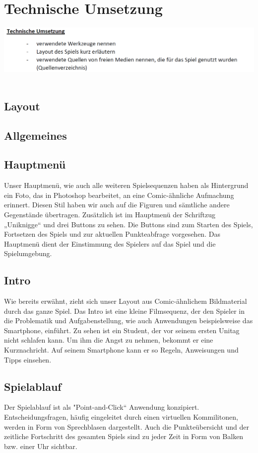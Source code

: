 \documentclass[a4paper, 11pt]{article} %
\begin{document}
\section{Technische Umsetzung}
\includegraphics[scale=0.5]{images/umsetzung.png}\\\\
\subsection{Layout}
\subsection{Allgemeines}
\subsection{Hauptmenü}
Unser Hauptmenü, wie auch alle weiteren Spielsequenzen haben als Hintergrund ein Foto, das in Photoshop bearbeitet, an eine Comic-ähnliche Aufmachung erinnert. Diesen Stil haben wir auch auf die Figuren und sämtliche andere Gegenstände übertragen.
Zusätzlich ist im Hauptmenü der Schriftzug „Uniknigge“ und drei Buttons zu sehen. Die Buttons sind zum Starten des Spiels, Fortsetzen des Spiels und zur aktuellen Punkteabfrage vorgesehen. Das Hauptmenü dient der Einstimmung des Spielers auf das Spiel und die Spielumgebung.

\subsection{Intro}
Wie bereits erwähnt, zieht sich unser Layout aus Comic-ähnlichem Bildmaterial durch das ganze Spiel. Das Intro ist eine kleine Filmsequenz, der den Spieler in die Problematik und Aufgabenstellung, wie auch Anwendungen beispielsweise das Smartphone, einführt. Zu sehen ist ein Student, der vor seinem ersten Unitag nicht schlafen kann. Um ihm die Angst zu nehmen, bekommt er eine Kurznachricht. Auf seinem Smartphone kann er so Regeln, Anweisungen und Tipps einsehen.

\subsection{Spielablauf}
Der Spielablauf ist als "Point-and-Click“ Anwendung konzipiert. Entscheidungsfragen, häufig eingeleitet durch einen virtuellen Kommilitonen, werden in Form von Sprechblasen dargestellt.
Auch die Punkteübersicht und der zeitliche Fortschritt des gesamten Spiels sind zu jeder Zeit in Form von Balken bzw. einer Uhr sichtbar.
\end{document}
